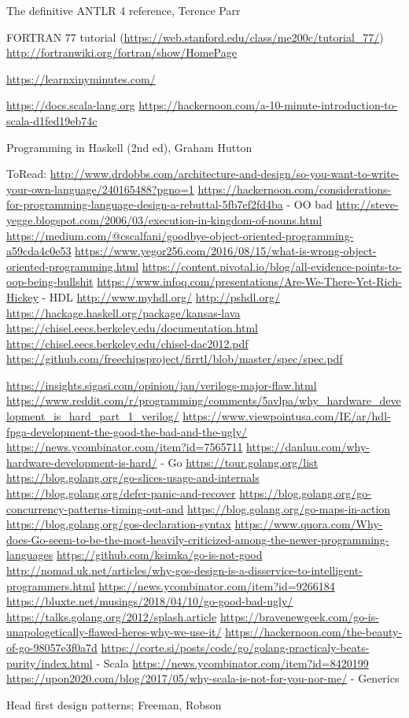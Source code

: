 \documentclass{report}
\begin{document}
The definitive ANTLR 4 reference, Terence Parr

FORTRAN 77 tutorial (\url{https://web.stanford.edu/class/me200c/tutorial_77/})
\url{http://fortranwiki.org/fortran/show/HomePage}

\url{https://learnxinyminutes.com/}


\url{https://docs.scala-lang.org}
\url{https://hackernoon.com/a-10-minute-introduction-to-scala-d1fed19eb74c}

Programming in Haskell (2nd ed), Graham Hutton

ToRead:
\url{http://www.drdobbs.com/architecture-and-design/so-you-want-to-write-your-own-language/240165488?pgno=1}
\url{https://hackernoon.com/considerations-for-programming-language-design-a-rebuttal-5fb7ef2fd4ba}
- OO bad
\url{http://steve-yegge.blogspot.com/2006/03/execution-in-kingdom-of-nouns.html}
\url{https://medium.com/@cscalfani/goodbye-object-oriented-programming-a59cda4c0e53}
\url{https://www.yegor256.com/2016/08/15/what-is-wrong-object-oriented-programming.html}
\url{https://content.pivotal.io/blog/all-evidence-points-to-oop-being-bullshit}
\url{https://www.infoq.com/presentations/Are-We-There-Yet-Rich-Hickey}
- HDL
\url{http://www.myhdl.org/}
\url{http://pshdl.org/}
\url{https://hackage.haskell.org/package/kansas-lava}
\url{https://chisel.eecs.berkeley.edu/documentation.html}
\url{https://chisel.eecs.berkeley.edu/chisel-dac2012.pdf}
\url{https://github.com/freechipsproject/firrtl/blob/master/spec/spec.pdf}

\url{https://insights.sigasi.com/opinion/jan/verilogs-major-flaw.html}
\url{https://www.reddit.com/r/programming/comments/5avlpa/why_hardware_development_is_hard_part_1_verilog/}
\url{https://www.viewpointusa.com/IE/ar/hdl-fpga-development-the-good-the-bad-and-the-ugly/}
\url{https://news.ycombinator.com/item?id=7565711}
\url{https://danluu.com/why-hardware-development-is-hard/}
- Go
\url{https://tour.golang.org/list}
\url{https://blog.golang.org/go-slices-usage-and-internals}
\url{https://blog.golang.org/defer-panic-and-recover}
\url{https://blog.golang.org/go-concurrency-patterns-timing-out-and}
\url{https://blog.golang.org/go-maps-in-action}
\url{https://blog.golang.org/gos-declaration-syntax}
\url{https://www.quora.com/Why-does-Go-seem-to-be-the-most-heavily-criticized-among-the-newer-programming-languages}
\url{https://github.com/ksimka/go-is-not-good}
\url{http://nomad.uk.net/articles/why-gos-design-is-a-disservice-to-intelligent-programmers.html}
\url{https://news.ycombinator.com/item?id=9266184}
\url{https://bluxte.net/musings/2018/04/10/go-good-bad-ugly/}
\url{https://talks.golang.org/2012/splash.article}
\url{https://bravenewgeek.com/go-is-unapologetically-flawed-heres-why-we-use-it/}
\url{https://hackernoon.com/the-beauty-of-go-98057e3f0a7d}
\url{https://corte.si/posts/code/go/golang-practicaly-beats-purity/index.html}
- Scala
\url{https://news.ycombinator.com/item?id=8420199}
\url{https://upon2020.com/blog/2017/05/why-scala-is-not-for-you-nor-me/}
- Generics


Head first design patterns; Freeman, Robson
\end{document}
